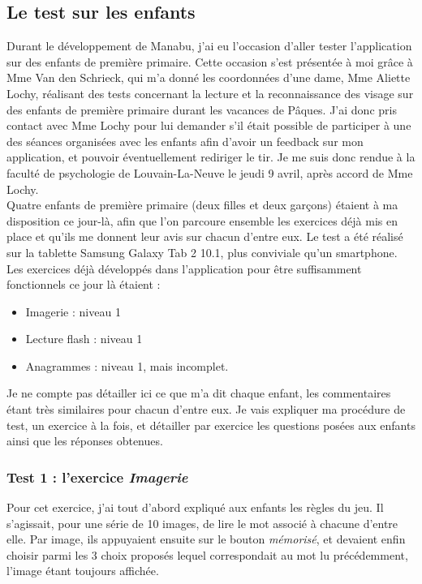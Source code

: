 \subsection{Le test sur les enfants \label{testEnfants}}
Durant le développement de Manabu, j'ai eu l'occasion d'aller tester l'application sur des enfants de première primaire. Cette occasion s'est présentée à moi grâce à Mme Van den Schrieck, qui m'a donné les coordonnées d'une dame, Mme Aliette Lochy, réalisant des tests concernant la lecture et la reconnaissance des visage sur des enfants de première primaire durant les vacances de Pâques. J'ai donc pris contact avec Mme Lochy pour lui demander s'il était possible de participer à une des séances organisées avec les enfants afin d'avoir un feedback sur mon application, et pouvoir éventuellement rediriger le tir. Je me suis donc rendue à la faculté de psychologie de Louvain-La-Neuve le jeudi 9 avril, après accord de Mme Lochy.\\

Quatre enfants de première primaire (deux filles et deux garçons) étaient à ma disposition ce jour-là, afin que l'on parcoure ensemble les exercices déjà mis en place et qu'ils me donnent leur avis sur chacun d'entre eux. Le test a été réalisé sur la tablette Samsung Galaxy Tab 2 10.1, plus conviviale qu'un smartphone. Les exercices déjà développés dans l'application pour être suffisamment fonctionnels ce jour là étaient :
\begin{itemize}
\item Imagerie : niveau 1
\item Lecture flash : niveau 1
\item Anagrammes : niveau 1, mais incomplet.
\end{itemize}
Je ne compte pas détailler ici ce que m'a dit chaque enfant, les commentaires étant très similaires pour chacun d'entre eux. Je vais expliquer ma procédure de test, un exercice à la fois, et détailler par exercice les questions posées aux enfants ainsi que les réponses obtenues.

\subsubsection{Test 1 : l'exercice \textit{Imagerie}}
Pour cet exercice, j'ai tout d'abord expliqué aux enfants les règles du jeu. Il s'agissait, pour une série de 10 images, de lire le mot associé à chacune d'entre elle. Par image, ils appuyaient ensuite sur le bouton \textit{mémorisé}, et devaient enfin choisir parmi les 3 choix proposés lequel correspondait au mot lu précédemment, l'image étant toujours affichée.\\

